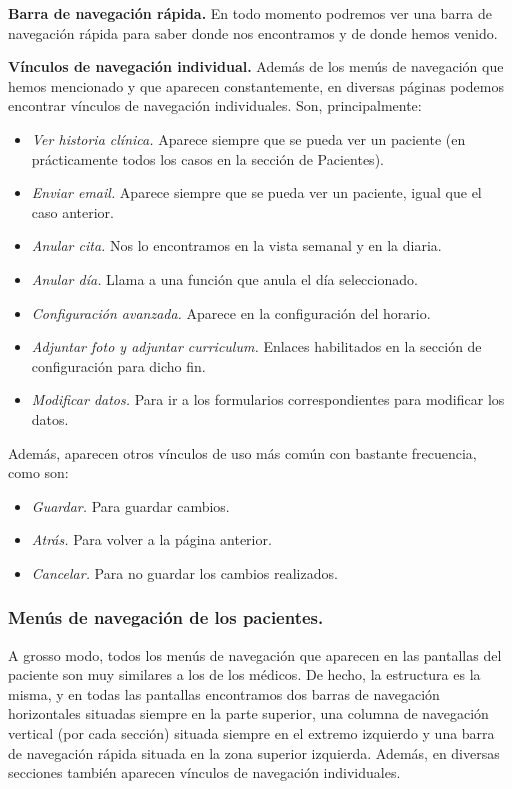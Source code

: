 			\textbf{Barra de navegación rápida.} En todo momento podremos ver una barra de navegación rápida para saber donde nos encontramos y de donde hemos venido.
			
			\textbf{Vínculos de navegación individual.} Además de los menús de navegación que hemos mencionado y que aparecen constantemente, en diversas páginas podemos encontrar vínculos de navegación individuales. Son, principalmente:
			\begin{itemize}
				\item \textit{Ver historia clínica.} Aparece siempre que se pueda ver un paciente (en prácticamente todos los casos en la sección de Pacientes).
				\item \textit{Enviar email.} Aparece siempre que se pueda ver un paciente, igual que el caso anterior.
				\item \textit{Anular cita.} Nos lo encontramos en la vista semanal y en la diaria.
				\item \textit{Anular día.} Llama a una función que anula el día seleccionado. 
				\item \textit{Configuración avanzada.} Aparece en la configuración del horario.
				\item \textit{Adjuntar foto y adjuntar curriculum.} Enlaces habilitados en la sección de configuración para dicho fin.
				\item \textit{Modificar datos.} Para ir a los formularios correspondientes para modificar los datos.
			\end{itemize}
			
			Además, aparecen otros vínculos de uso más común con bastante frecuencia, como son:
			\begin{itemize}
				\item \textit{Guardar.} Para guardar cambios.
				\item \textit{Atrás.} Para volver a la página anterior.
				\item \textit{Cancelar.} Para no guardar los cambios realizados.
			\end{itemize}
			
			
		\newpage
		\subsubsection{Menús de navegación de los pacientes.} %
		\label{par:nav_menus_de_navegacion_de_los_pacientes}
		
		A grosso modo, todos los menús de navegación que aparecen en las pantallas del paciente son muy similares a los de los médicos. De hecho, la estructura es la misma, y en todas las pantallas encontramos dos barras de navegación horizontales situadas siempre en la parte superior, una columna de navegación vertical (por cada sección) situada siempre en el extremo izquierdo y una barra de navegación rápida situada en la zona superior izquierda. Además, en diversas secciones también aparecen vínculos de navegación individuales.
		
